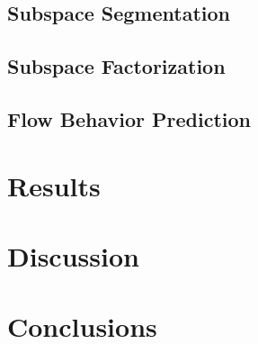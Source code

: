 \documentclass[conference]{IEEEtran}
\begin{document}
\subsection{Subspace Segmentation}

\subsection{Subspace Factorization}

\subsection{Flow Behavior Prediction}

\section{Results}

\section{Discussion}

\section{Conclusions}


\end{document}
